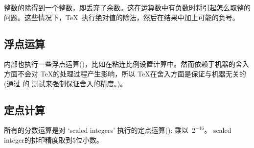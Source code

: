 \documentclass{book}
\begin{document}
整数的除得到一个整数，即丢弃了余数。这在运算数中有负数时将引起怎么取整的问题。这些情况下，\TeX\ 执行绝对值的除法，然后在结果中加上可能的负号。


\subsection{浮点运算}


内部也执行一些浮点运算()，比如在粘连比例设置计算中。然而依赖于机器的舍入方面不会对 \TeX 的处理过程产生影响，所以 \TeX 在舍入方面是保证与机器无关的(通过\cite{K:trip} 的 测试来强制保证舍入的精度。)。

\subsection{定点计算}

所有的分数运算是对 `scaled integers' 执行的定点运算(): 乘以~$2^{-16}$。
scaled integer的排印精度取到5位小数。


\end{document}
